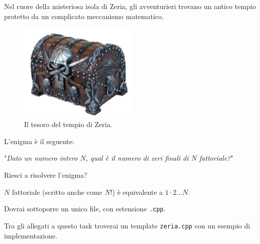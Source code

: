 \usepackage{xcolor}
\usepackage{afterpage}
\usepackage{pifont,mdframed}
\usepackage[bottom]{footmisc}
\usepackage{minted}


\newcommand{\inputfile}{\texttt{stdin}}
\newcommand{\outputfile}{\texttt{stdout}}
\makeatletter
\renewcommand{\this@inputfilename}{\texttt{stdin}}
\renewcommand{\this@outputfilename}{\texttt{stdout}}
\makeatother


Nel cuore della misteriosa isola di Zeria, gli avventurieri trovano un antico tempio protetto da un complicato
meccanismo matematico.

\begin{figure}[h]
    \centering
    \includegraphics[width=0.5\textwidth]{chest.png}
    \caption{Il tesoro del tempio di Zeria.}
\end{figure}

L'enigma è il seguente:

"\textit{Dato un numero intero $N$, qual è il numero di zeri finali di $N$ fattoriale?}"

Riesci a risolvere l'enigma?
\begin{warning}
    $N$ fattoriale (scritto anche come $N!$) è equivalente a $1 \cdot 2 \dots N$.
\end{warning}




\Implementation

Dovrai sottoporre un unico file, con estensione \texttt{.cpp}.

\begin{warning}
    Tra gli allegati a questo task troverai un template \texttt{zeria.cpp} con un esempio di implementazione.
\end{warning}

